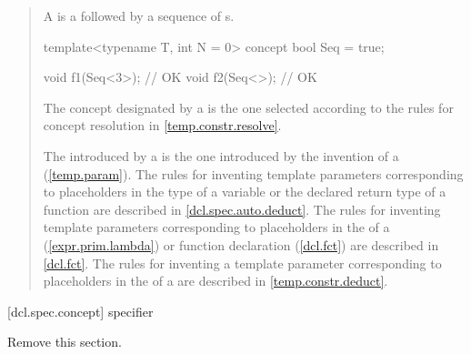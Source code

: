 \begin{quote}
\pnum
A  is a  followed 
by a sequence of s.
%
\enterexample
\begin{codeblock}
template<typename T, int N = 0> concept bool Seq = true;

void f1(Seq<3>); // OK
void f2(Seq<>);  // OK
\end{codeblock}
\exitexample

\pnum
The concept designated by a 
is the one selected according to the rules for concept resolution in
\ref{temp.constr.resolve}.

\pnum
\enternote
The  introduced by a 
 is the one introduced by the invention of a
 (\ref{temp.param}).
%
The rules for inventing template parameters corresponding to placeholders
in the type of a variable or the declared return type of a function are
described in \ref{dcl.spec.auto.deduct}.
% 
The rules for inventing template parameters corresponding to placeholders
in the  of a
 (\ref{expr.prim.lambda})
or function declaration (\ref{dcl.fct}) are described in
\ref{dcl.fct}.
% 
The rules for inventing a template parameter corresponding to placeholders
in the  of a 
 are described in 
\ref{temp.constr.deduct}.
\exitnote
\end{quote}


[dcl.spec.concept]{ specifier}

Remove this section.

